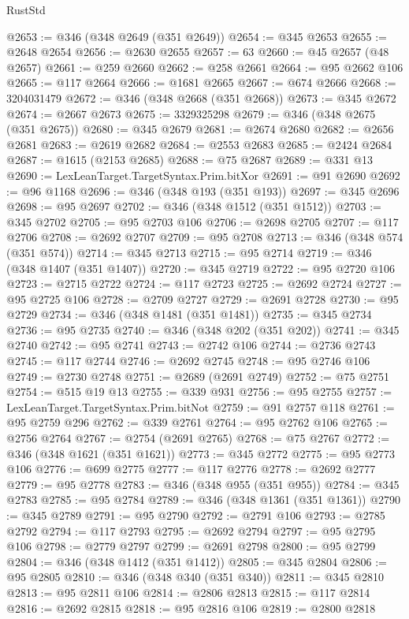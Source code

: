 \begin{lexlean}{RustStd}
\begin{coremodule}
{\begin{coremodule}
{{{{{{{{{{{{{{{{{{{{{{{{{{{{{{{{{{{{{{{@2653 := @346 (@348 @2649 (@351 @2649))
@2654 := @345 @2653
@2655 := @2648 @2654
@2656 := @2630 @2655
@2657 := 63
@2660 := @45 @2657 (@48 @2657)
@2661 := @259 @2660
@2662 := @258 @2661
@2664 := @95 @2662 @106
@2665 := @117 @2664
@2666 := @1681 @2665
@2667 := @674 @2666
@2668 := 3204031479
@2672 := @346 (@348 @2668 (@351 @2668))
@2673 := @345 @2672
@2674 := @2667 @2673
@2675 := 3329325298
@2679 := @346 (@348 @2675 (@351 @2675))
@2680 := @345 @2679
@2681 := @2674 @2680
@2682 := @2656 @2681
@2683 := @2619 @2682
@2684 := @2553 @2683
@2685 := @2424 @2684
@2687 := @1615 (@2153 @2685)
@2688 := @75 @2687
@2689 := @331 @13
@2690 := LexLeanTarget.TargetSyntax.Prim.bitXor
@2691 := @91 @2690
@2692 := @96 @1168
@2696 := @346 (@348 @193 (@351 @193))
@2697 := @345 @2696
@2698 := @95 @2697
@2702 := @346 (@348 @1512 (@351 @1512))
@2703 := @345 @2702
@2705 := @95 @2703 @106
@2706 := @2698 @2705
@2707 := @117 @2706
@2708 := @2692 @2707
@2709 := @95 @2708
@2713 := @346 (@348 @574 (@351 @574))
@2714 := @345 @2713
@2715 := @95 @2714
@2719 := @346 (@348 @1407 (@351 @1407))
@2720 := @345 @2719
@2722 := @95 @2720 @106
@2723 := @2715 @2722
@2724 := @117 @2723
@2725 := @2692 @2724
@2727 := @95 @2725 @106
@2728 := @2709 @2727
@2729 := @2691 @2728
@2730 := @95 @2729
@2734 := @346 (@348 @1481 (@351 @1481))
@2735 := @345 @2734
@2736 := @95 @2735
@2740 := @346 (@348 @202 (@351 @202))
@2741 := @345 @2740
@2742 := @95 @2741
@2743 := @2742 @106
@2744 := @2736 @2743
@2745 := @117 @2744
@2746 := @2692 @2745
@2748 := @95 @2746 @106
@2749 := @2730 @2748
@2751 := @2689 (@2691 @2749)
@2752 := @75 @2751
@2754 := @515 @19 @13
@2755 := @339 @931
@2756 := @95 @2755
@2757 := LexLeanTarget.TargetSyntax.Prim.bitNot
@2759 := @91 @2757 @118
@2761 := @95 @2759 @296
@2762 := @339 @2761
@2764 := @95 @2762 @106
@2765 := @2756 @2764
@2767 := @2754 (@2691 @2765)
@2768 := @75 @2767
@2772 := @346 (@348 @1621 (@351 @1621))
@2773 := @345 @2772
@2775 := @95 @2773 @106
@2776 := @699 @2775
@2777 := @117 @2776
@2778 := @2692 @2777
@2779 := @95 @2778
@2783 := @346 (@348 @955 (@351 @955))
@2784 := @345 @2783
@2785 := @95 @2784
@2789 := @346 (@348 @1361 (@351 @1361))
@2790 := @345 @2789
@2791 := @95 @2790
@2792 := @2791 @106
@2793 := @2785 @2792
@2794 := @117 @2793
@2795 := @2692 @2794
@2797 := @95 @2795 @106
@2798 := @2779 @2797
@2799 := @2691 @2798
@2800 := @95 @2799
@2804 := @346 (@348 @1412 (@351 @1412))
@2805 := @345 @2804
@2806 := @95 @2805
@2810 := @346 (@348 @340 (@351 @340))
@2811 := @345 @2810
@2813 := @95 @2811 @106
@2814 := @2806 @2813
@2815 := @117 @2814
@2816 := @2692 @2815
@2818 := @95 @2816 @106
@2819 := @2800 @2818
}}}}}}}}}}}}}}}}}}}}}}}}}}}}}}}}}}}}}}}
\end{coremodule}}
\end{coremodule}
\end{lexlean}
